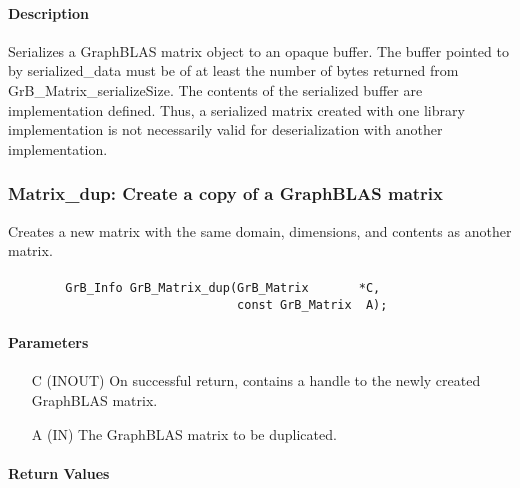 \paragraph{Description}

Serializes a GraphBLAS matrix object to an opaque buffer.  The buffer pointed to
by {\sf serialized\_data} must be of at least the number of bytes returned
from {\sf GrB\_Matrix\_serializeSize}.  The contents of the serialized buffer
are implementation defined.  Thus, a serialized matrix created with one library
implementation is not necessarily valid for deserialization with another implementation.


\subsubsection{{\sf Matrix\_dup}: Create a copy of a GraphBLAS matrix}

Creates a new matrix with the same domain, dimensions, and contents as 
another matrix.

\paragraph{\syntax}

\begin{verbatim}
        GrB_Info GrB_Matrix_dup(GrB_Matrix       *C,
                                const GrB_Matrix  A);
\end{verbatim}

\paragraph{Parameters}

\begin{itemize}[leftmargin=1.1in]
    \item[{\sf C}] ({\sf INOUT}) On successful return, contains a handle to 
                                 the newly created GraphBLAS matrix.
    \item[{\sf A}] ({\sf IN})    The GraphBLAS matrix to be duplicated.
\end{itemize}


\paragraph{Return Values}

